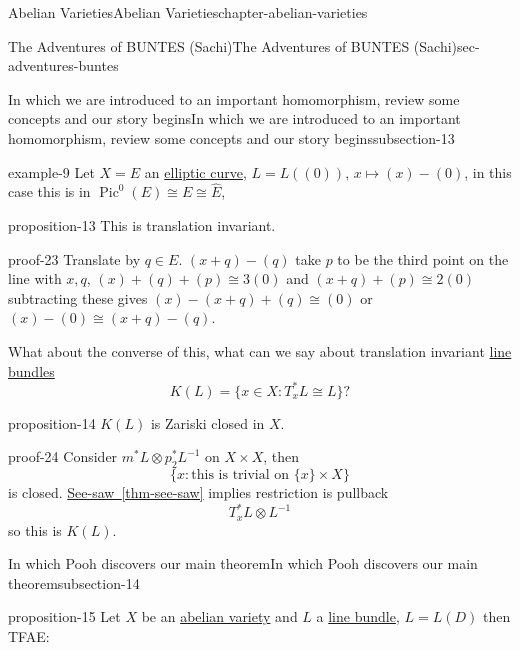 \documentclass[oneside,10pt,]{book}
\numberwithin{equation}{section}
\DeclareMathOperator{\Pic}{Pic}
\begin{document}
\begin{chapterptx}{Abelian Varieties}{}{Abelian Varieties}{}{}{chapter-abelian-varieties}
\begin{sectionptx}{The Adventures of BUNTES (Sachi)}{}{The Adventures of BUNTES (Sachi)}{}{}{sec-adventures-buntes}
\begin{subsectionptx}{In which we are introduced to an important homomorphism, review some concepts and our story begins}{}{In which we are introduced to an important homomorphism, review some concepts and our story begins}{}{}{subsection-13}
\begin{example}{}{example-9}%
\hypertarget{p-135}{}%
Let \(X =E\) an \hyperref[def-supersing-isog-ec]{elliptic curve}, \(L = L((0))\), \(x\mapsto (x) - (0)\), in this case this is in \(\Pic^0(E) \cong E \cong \widehat E\),%
\end{example}
\begin{proposition}{}{}{proposition-13}%
\hypertarget{p-136}{}%
This is translation invariant.%
\end{proposition}
\begin{proofptx}{}{proof-23}
\hypertarget{p-137}{}%
Translate by \(q\in E\). \((x+q) - (q)\) take \(p\) to be the third point on the line with \(x,q\), \((x) + (q) + (p) \cong 3(0)\) and \((x+q) + (p) \cong 2 (0)\) subtracting these gives \((x) - (x+q) +(q) \cong (0)\) or \((x) - (0) \cong (x+q) -(q)\).%
\end{proofptx}
\hypertarget{p-138}{}%
What about the converse of this, what can we say about translation invariant \hyperref[def-line-bundle]{line bundles}%
\begin{equation*}
K(L) = \{x\in X : T_x^* L \cong L\}\text{?}
\end{equation*}
%
\begin{proposition}{}{}{proposition-14}%
\hypertarget{p-139}{}%
\(K(L)\) is Zariski closed in \(X\).%
\end{proposition}
\begin{proofptx}{}{proof-24}
\hypertarget{p-140}{}%
Consider \(m^* L \otimes p_2^*L^{-1}\) on \(X\times X\), then%
\begin{equation*}
\{x : \text{this is trivial on }\{x\}\times X\}
\end{equation*}
is closed. \hyperref[thm-see-saw]{See-saw~\ref{thm-see-saw}} implies restriction is pullback%
\begin{equation*}
T_x^*L \otimes L^{-1}
\end{equation*}
so this is \(K(L)\).%
\end{proofptx}
\end{subsectionptx}
%
%
\typeout{************************************************}
\typeout{************************************************}
%
\begin{subsectionptx}{In which Pooh discovers our main theorem}{}{In which Pooh discovers our main theorem}{}{}{subsection-14}
\begin{proposition}{}{}{proposition-15}%
\hypertarget{p-141}{}%
Let \(X\) be an \hyperref[def-buntes-abvar]{abelian variety} and \(L\) a \hyperref[def-line-bundle]{line bundle}, \(L = L(D)\) then TFAE:\leavevmode%

\end{proposition}
\end{subsectionptx}
\end{sectionptx}
\end{chapterptx}
\end{document}
